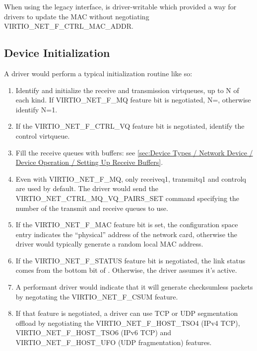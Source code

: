 When using the legacy interface,  is driver-writable
which provided a way for drivers to update the MAC without
negotiating VIRTIO_NET_F_CTRL_MAC_ADDR.

\subsection{Device Initialization}\label{sec:Device Types / Network Device / Device Initialization}

A driver would perform a typical initialization routine like so:

\begin{enumerate}
\item Identify and initialize the receive and
  transmission virtqueues, up to N of each kind. If
  VIRTIO_NET_F_MQ feature bit is negotiated,
  N=, otherwise identify N=1.

\item If the VIRTIO_NET_F_CTRL_VQ feature bit is negotiated,
  identify the control virtqueue.

\item Fill the receive queues with buffers: see \ref{sec:Device Types / Network Device / Device Operation / Setting Up Receive Buffers}.

\item Even with VIRTIO_NET_F_MQ, only receiveq1, transmitq1 and
  controlq are used by default.  The driver would send the
  VIRTIO_NET_CTRL_MQ_VQ_PAIRS_SET command specifying the
  number of the transmit and receive queues to use.

\item If the VIRTIO_NET_F_MAC feature bit is set, the configuration
  space  entry indicates the ``physical'' address of the
  network card, otherwise the driver would typically generate a random
  local MAC address.

\item If the VIRTIO_NET_F_STATUS feature bit is negotiated, the link
  status comes from the bottom bit of .
  Otherwise, the driver assumes it's active.

\item A performant driver would indicate that it will generate checksumless
  packets by negotating the VIRTIO_NET_F_CSUM feature.

\item If that feature is negotiated, a driver can use TCP or UDP
  segmentation offload by negotiating the VIRTIO_NET_F_HOST_TSO4 (IPv4
  TCP), VIRTIO_NET_F_HOST_TSO6 (IPv6 TCP) and VIRTIO_NET_F_HOST_UFO
  (UDP fragmentation) features.


\end{enumerate}
